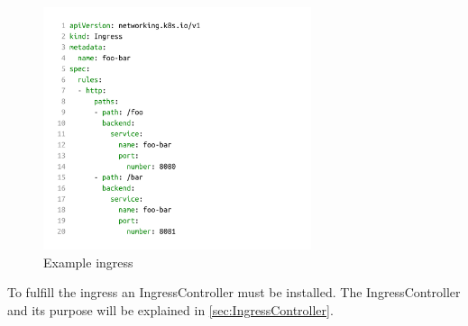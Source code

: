 \begin{figure}[H]
    \centering
    \includegraphics[width=0.7\textwidth, left]{media/02/ingress}
    \caption{Example ingress}
    \label{fig:ingress}
\end{figure}

To fulfill the ingress an IngressController must be installed.
The IngressController and its purpose will be explained in \autoref{sec:IngressController}.
